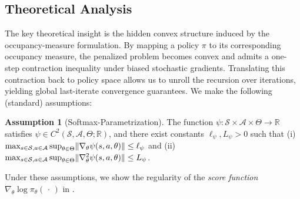 \documentclass{article}
\theoremstyle{plain}
\theoremstyle{definition}
\newtheorem{assumption}[theorem]{Assumption}
\theoremstyle{remark}
\def\RR{{\mathbb{R}}}
\def\SS{{\mathcal{S}}}
\def\AA{{\mathcal{A}}}
\newcommand{\innerEmpty}{\,\cdot\,}
\DeclarePairedDelimiter{\norm}{\lVert}{\rVert}
\def\ss{{s}}
\def\aa{{a}}
\def\ss{{s}}
\def\gradPsi{{\ell_{\psi}}}
\def\jacPsi{{L_{\psi}}}
\begin{document}
\subsection{Theoretical Analysis}
\label{sec:TheoreticalAnalysis}
The key theoretical insight is the hidden convex structure induced by the
occupancy-measure formulation. By mapping a policy $\pi$ to its
corresponding occupancy measure, the penalized problem becomes convex and
admits a one-step contraction inequality under biased stochastic gradients.
Translating this contraction back to policy space allows us to unroll the
recursion over iterations, yielding global last-iterate convergence
guarantees.
We make the following (standard) assumptions:

\begin{assumption}[Softmax-Parametrization]\label{ass:Softmax}
 The function $\psi : \SS \times \AA \times \Theta \to \RR$
 satisfies $\psi \in C^2(\SS, \AA, \Theta; \RR)$, and there exist
 constants $\gradPsi, \jacPsi > 0$ such that
 (i) $\max_{\ss\in\SS, \aa\in\AA} \sup_{\theta \in \Theta}
  \norm{\nabla_\theta \psi(\ss, \aa, \theta)} \leq \gradPsi$
 and (ii) $\max_{\ss\in\SS, \aa\in\AA} \sup_{\theta \in \Theta}
  \norm{\nabla^2_\theta \psi(\ss, \aa, \theta)} \leq \jacPsi$.
 \end{assumption}
Under these assumptions, we show the regularity of the \emph{score function}
$\nabla_\theta \log \pi_\theta(\innerEmpty{})$ in .
\end{document}
